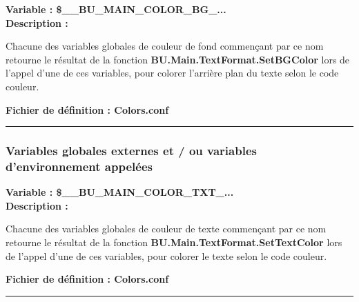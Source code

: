 \documentclass[a4paper,10pt]{article}
\begin{document}
    \textbf{Variable : \color{vars}\$\_\_BU\_MAIN\_COLOR\_BG\_...}\\[1\baselineskip]

    \textbf{Description :}

    \begin{justify}
        Chacune des variables globales de couleur de fond commençant par ce nom retourne le résultat de la fonction \textbf{\color{func}BU.Main.TextFormat.SetBGColor} lors de l'appel d'une de ces variables, pour colorer l'arrière plan du texte selon le code couleur.
    \end{justify}

    \textbf{Fichier de définition : \color{path}Colors.conf}\\[1\baselineskip]



    \color{sec3}\par\noindent\rule{\textwidth}{0.4pt}\color{text}

    \color{sec3}
    \subsubsection{Variables globales externes et / ou variables d'environnement appelées}\color{text}

    \textbf{Variable : \color{vars}\$\_\_BU\_MAIN\_COLOR\_TXT\_...}\\[1\baselineskip]

    \textbf{Description :}

    \begin{justify}
        Chacune des variables globales de couleur de texte commençant par ce nom retourne le résultat de la fonction \textbf{\color{func}BU.Main.TextFormat.SetTextColor} lors de l'appel d'une de ces variables, pour colorer le texte selon le code couleur.
    \end{justify}

    \textbf{Fichier de définition : \color{path}Colors.conf}\\[1\baselineskip]




    \color{vars}\par\noindent\rule{\textwidth}{0.4pt}\color{text}\\[1\baselineskip]
\end{document}
